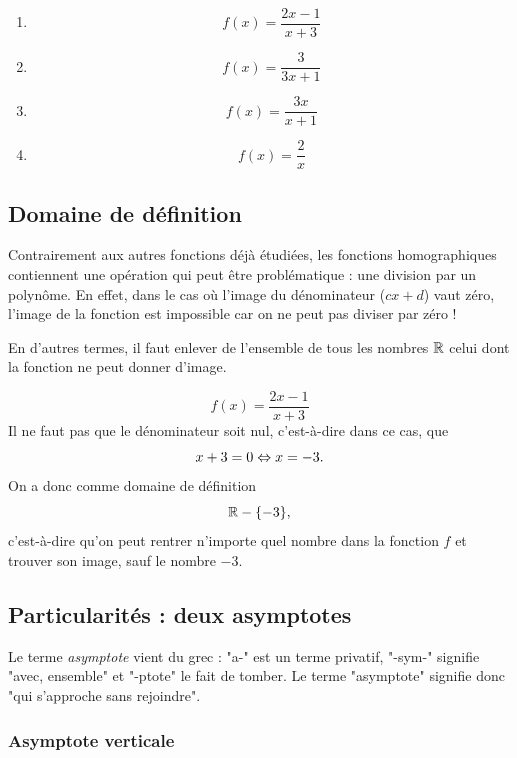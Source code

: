 \begin{multicols}{2}
\begin{exemple}
\begin{enumerate}
\item $$f(x) = \frac{2x-1}{x+3}$$
\item $$f(x) = \frac{3}{3x+1}$$
\item $$f(x) = \frac{3x}{x+1}$$
\item $$f(x) = \frac{2}{x}$$
\end{enumerate}
\end{exemple}
\end{multicols}

\subsection{Domaine de définition}

Contrairement aux autres fonctions déjà étudiées, les fonctions homographiques contiennent une opération qui peut être problématique : une division par un polynôme. En effet, dans le cas où l'image du dénominateur ($cx+d$) vaut zéro, l'image de la fonction est impossible car on ne peut pas diviser par zéro !

En d'autres termes, il faut enlever de l'ensemble de tous les nombres $\mathbb{R}$ celui dont la fonction ne peut donner d'image.

\begin{exemple}
$$
f(x) = \frac{2x-1}{x+3}
$$
Il ne faut pas que le dénominateur soit nul, c'est-à-dire dans ce cas, que 
$$
x+3 = 0 \Leftrightarrow x=-3.
$$
On a donc comme domaine de définition 
$$
\mathbb{R}-\{-3\},
$$
c'est-à-dire qu'on peut rentrer n'importe quel nombre dans la fonction $f$ et trouver son image, sauf le nombre $-3$.
\end{exemple}

\subsection{Particularités : deux asymptotes}

Le terme \emph{asymptote} vient du grec : "a-" est un terme privatif, "-sym-" signifie "avec, ensemble" et "-ptote" le fait de tomber. Le terme "asymptote" signifie donc "qui s'approche sans rejoindre".

\subsubsection{Asymptote verticale}

